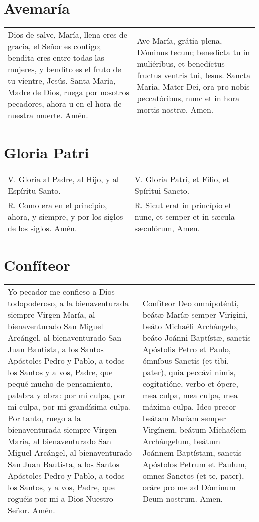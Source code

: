 \documentclass[11pt,a4paper]{book}
\begin{document}
    \section*{Avemaría}\label{sec:avemaria}
    \begin{longtable} { p{} p{} }
        Dios de salve, María, llena eres de gracia, el Señor es contigo; bendita eres entre todas las mujeres, 
        y bendito es el fruto de tu vientre, Jesús. Santa María, Madre de Dios, ruega por nosotros pecadores, 
        ahora u en el hora de nuestra muerte. Amén.
        
        &
        
        Ave María, grátia plena, Dóminus tecum; benedicta tu in muliéribus, et benedíctus fructus ventris tui, 
        Iesus. Sancta Maria, Mater Dei, ora pro nobis peccatóribus, nunc et in hora mortis nostræ. Amen.
    \end{longtable}

    \section*{Gloria Patri}\label{sec_gloria}
    \begin{longtable} { p{} p{} }
        V. Gloria al Padre, al Hijo, y al Espíritu Santo. &
        V. Gloria Patri, et Filio, et Spíritui Sancto.\\
        
        R. Como era en el principio, ahora, y siempre, y por los siglos de los siglos. Amén. &
        R. Sicut erat in princípio et nunc, et semper et in sæcula sæculórum, Amen.
    \end{longtable}

    \section*{Confíteor}\label{sec:confiteor}
    \begin{longtable} { p{} p{} }
        Yo pecador me confieso a Dios todopoderoso, a la bienaventurada siempre Virgen María, al bienaventurado San Miguel Arcángel, 
        al bienaventurado San Juan Bautista, a los Santos Apóstoles Pedro y Pablo, a todos los Santos y a vos, Padre, que pequé mucho 
        de pensamiento, palabra y obra: por mi culpa, por mi culpa, por mi grandísima culpa. Por tanto, ruego a la bienaventurada 
        siempre Virgen María, al bienaventurado San Miguel Arcángel, al bienaventurado San Juan Bautista, a los Santos Apóstoles 
        Pedro y Pablo, a todos los Santos, y a vos, Padre, que roguéis por mi a Dios Nuestro Señor. Amén. 
        &
        Confíteor Deo omnipoténti, beátæ Maríæ semper Virigini, beáto Michaéli Archángelo, beáto Joánni Baptístæ, sanctis Apóstolis Petro et Paulo, 
        ómníbus Sanctis (et tibi, pater), quia peccávi nimis, cogitatióne, verbo et ópere, mea culpa, mea culpa, mea máxima culpa. Ideo precor beátam 
        Maríam semper Virgínem, beátum Michaélem Archángelum, beátum Joánnem Baptístam, sanctis Apóstolos Petrum et Paulum, omnes Sanctos (et te, pater), 
        oráre pro me ad Dóminum Deum nostrum. Amen.
    \end{longtable}
\end{document}
